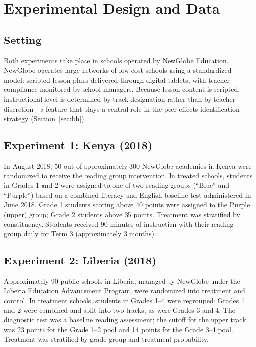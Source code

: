 \documentclass[11pt]{article}
\begin{document}
\section{Experimental Design and Data}
\label{sec:design}

\subsection{Setting}

Both experiments take place in schools operated by NewGlobe Education. NewGlobe operates large networks of low-cost schools using a standardized model: scripted lesson plans delivered through digital tablets, with teacher compliance monitored by school managers. Because lesson content is scripted, instructional level is determined by track designation rather than by teacher discretion---a feature that plays a central role in the peer-effects identification strategy (Section~\ref{sec:bh}).

\subsection{Experiment 1: Kenya (2018)}

In August 2018, 50 out of approximately 300 NewGlobe academies in Kenya were randomized to receive the reading group intervention. In treated schools, students in Grades 1 and 2 were assigned to one of two reading groups (``Blue'' and ``Purple'') based on a combined literacy and English baseline test administered in June 2018. Grade 1 students scoring above 40 points were assigned to the Purple (upper) group; Grade 2 students above 35 points. Treatment was stratified by constituency. Students received 90 minutes of instruction with their reading group daily for Term 3 (approximately 3 months).

\subsection{Experiment 2: Liberia (2018)}

Approximately 90 public schools in Liberia, managed by NewGlobe under the Liberia Education Advancement Program, were randomized into treatment and control. In treatment schools, students in Grades 1--4 were regrouped: Grades 1 and 2 were combined and split into two tracks, as were Grades 3 and 4. The diagnostic test was a baseline reading assessment; the cutoff for the upper track was 23 points for the Grade 1--2 pool and 14 points for the Grade 3--4 pool. Treatment was stratified by grade group and treatment probability.
\end{document}
